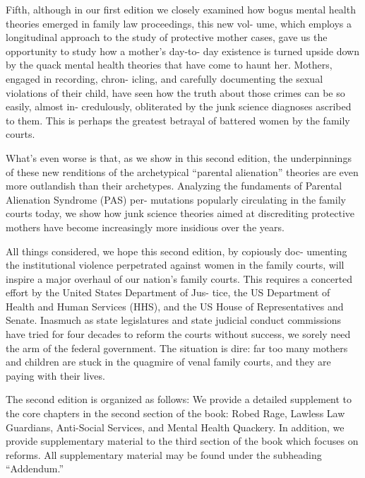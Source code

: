 Fifth, although in our first edition we closely examined how bogus
mental health theories emerged in family law proceedings, this new vol-
ume, which employs a longitudinal approach to the study of protective
mother cases, gave us the opportunity to study how a mother’s day-to-
day existence is turned upside down by the quack mental health theories
that have come to haunt her. Mothers, engaged in recording, chron-
icling, and carefully documenting the sexual violations of their child,
have seen how the truth about those crimes can be so easily, almost in-
credulously, obliterated by the junk science diagnoses ascribed to them.
This is perhaps the greatest betrayal of battered women by the family
courts. \pfl{}


What’s even worse is that, as we show in this second edition, the
underpinnings of these new renditions of the archetypical “parental
alienation” theories are even more outlandish than their archetypes.
Analyzing the fundaments of Parental Alienation Syndrome (PAS) per-
mutations popularly circulating in the family courts today, we show
how junk science theories aimed at discrediting protective mothers have
become increasingly more insidious over the years. \pfl{}


All things considered, we hope this second edition, by copiously doc-
umenting the institutional violence perpetrated against women in the
family courts, will inspire a major overhaul of our nation’s family courts.
This requires a concerted effort by the United States Department of Jus-
tice, the US Department of Health and Human Services (HHS), and the
US House of Representatives and Senate. Inasmuch as state legislatures
and state judicial conduct commissions have tried for four decades to
reform the courts without success, we sorely need the arm of the federal
government. The situation is dire: far too many mothers and children
are stuck in the quagmire of venal family courts, and they are paying
with their lives. \pfl{}


The second edition is organized as follows: We provide a detailed
supplement to the core chapters in the second section of the book:
Robed Rage, Lawless Law Guardians, Anti-Social Services, and Mental
Health Quackery. In addition, we provide supplementary material to the
third section of the book which focuses on reforms. All supplementary
material may be found under the subheading “Addendum.”


